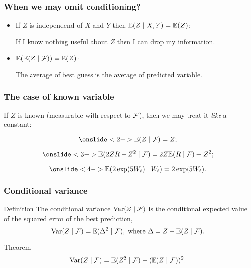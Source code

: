 \begin{frame}
    \frametitle{When we may omit conditioning?}

    \begin{itemize}[<+->]

        \item If $Z$ is \alert{independend} of $X$ and $Y$ then $\mathbb{E}(Z \mid X, Y) = \mathbb{E}(Z)$:

        If I know \alert{nothing useful} about $Z$ then I can drop my information. 

        \item $\mathbb{E}( \mathbb{E}( Z \mid \mathcal{F}) ) = \mathbb{E}(Z)$:
        
        The \alert{average of best guess} is the average of predicted variable. 

    \end{itemize}

\end{frame}




\begin{frame}
    \frametitle{The case of known variable}

    If $Z$ is \alert{known} (measurable with respect to $\mathcal{F}$), 
    then we may treat it \textit{like} a constant:

    \[
    \onslide<2->{\E(Z \mid \cF ) = Z;}
    \]

    \[
        \onslide<3->{\E(2Z R + Z^2 \mid \cF ) = 2Z \E(R\mid \cF) + Z^2;}
    \]

    \[
        \onslide<4->{\E(2\exp(5W_t) \mid W_t) = 2\exp(5W_t).}
    \]

\end{frame}


\begin{frame}
    \frametitle{Conditional variance}

    \begin{block}{Definition \formalduck}
        The \alert{conditional variance} $\operatorname{Var}(Z \mid \mathcal{F})$ is the conditional expected value of the 
        squared error of the best prediction,
        \pause
        \[
            \operatorname{Var}(Z \mid \mathcal{F}) = \mathbb{E}(\Delta^2 \mid \mathcal{F}), \text{ where } \Delta = Z - \mathbb{E}(Z \mid \mathcal{F}).
        \]
    \end{block}

    \pause 
    \begin{block}{Theorem \formalduck}
        \[
            \operatorname{Var}(Z \mid \mathcal{F}) = \mathbb{E}(Z^2 \mid \mathcal{F}) - (\mathbb{E}(Z \mid \mathcal{F}) )^2.
        \]
    \end{block}
\end{frame}




